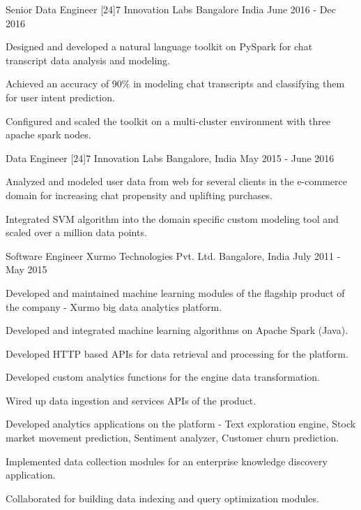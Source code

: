 \begin{cventries}
  \cventry
    {Senior Data Engineer}
    {[24]7 Innovation Labs}
    {Bangalore India}
    {June 2016 - Dec 2016}
    {
      \begin{cvitems}
        \item {Designed and developed a natural language toolkit on PySpark for chat transcript data analysis and modeling.}
        \item {Achieved an accuracy of 90\% in modeling chat transcripts and classifying them for user intent prediction.}
        \item {Configured and scaled the toolkit on a multi-cluster environment with three apache spark nodes.}
      \end{cvitems}
    }
  \cventry
    {Data Engineer}
    {[24]7 Innovation Labs}
    {Bangalore, India}
    {May 2015 - June 2016}
    {
      \begin{cvitems}
        \item {Analyzed and modeled user data from web for several clients in the e-commerce domain for increasing chat propensity and uplifting purchases.}
        \item {Integrated SVM algorithm into the domain specific custom modeling tool and scaled over a million data points.}
      \end{cvitems}
    }
  \cventry
    {Software Engineer}
    {Xurmo Technologies Pvt. Ltd.}
    {Bangalore, India}
    {July 2011 - May 2015}
    {
      \begin{cvitems}
        \item {Developed and maintained machine learning modules of the flagship product of the company - Xurmo big data analytics platform.}
        \item {Developed and integrated machine learning algorithms on Apache Spark (Java).}
        \item {Developed HTTP based APIs for data retrieval and processing for the platform.}
        \item {Developed custom analytics functions for the engine data transformation.}
        \item {Wired up data ingestion and services APIs of the product.}
        \item {Developed analytics applications on the platform - Text exploration engine, Stock market movement prediction, Sentiment analyzer, Customer churn prediction.}
        \item {Implemented data collection modules for an enterprise knowledge discovery application.}
        \item {Collaborated for building data indexing and query optimization modules.}
      \end{cvitems} 
    }
\end{cventries}

